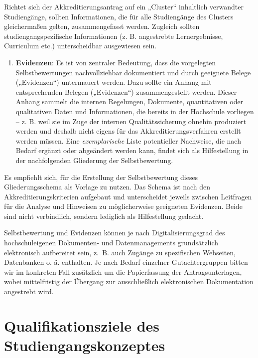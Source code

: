 Richtet sich der Akkreditierungsantrag auf ein „Cluster`` inhaltlich
verwandter Studiengänge, sollten Informationen, die für alle
Studiengänge des Clusters gleichermaßen gelten, zusammengefasst werden.
Zugleich sollten studiengangspezifische Informationen (z. B. angestrebte
Lernergebnisse, Curriculum etc.) unterscheidbar ausgewiesen sein.

\begin{enumerate}
\def\labelenumi{\arabic{enumi}.}
\tightlist
\item
  \textbf{Evidenzen}: Es ist von zentraler Bedeutung, dass die
  vorgelegten Selbstbewertungen nachvollziehbar dokumentiert und durch
  geeignete Belege („Evidenzen``) untermauert werden. Dazu sollte ein
  Anhang mit entsprechenden Belegen („Evidenzen``) zusammengestellt
  werden. Dieser Anhang sammelt die internen Regelungen, Dokumente,
  quantitativen oder qualitativen Daten und Informationen, die bereits
  in der Hochschule vorliegen -- z. B. weil sie im Zuge der internen
  Qualitätssicherung ohnehin produziert werden und deshalb nicht eigens
  für das Akkreditierungsverfahren erstellt werden müssen. Eine
  \emph{exemplarische} Liste potentieller Nachweise, die nach Bedarf
  ergänzt oder abgeändert werden kann, findet sich als Hilfestellung in
  der nachfolgenden Gliederung der Selbstbewertung.
\end{enumerate}

Es empfiehlt sich, für die Erstellung der Selbstbewertung dieses
Gliederungsschema als Vorlage zu nutzen. Das Schema ist nach den
Akkreditierungskriterien aufgebaut und unterscheidet jeweils zwischen
Leitfragen für die Analyse und Hinweisen zu möglicherweise geeigneten
Evidenzen. Beide sind nicht verbindlich, sondern lediglich als
Hilfestellung gedacht.

Selbstbewertung und Evidenzen können je nach Digitalisierungsgrad des
hochschuleigenen Dokumenten- und Datenmanagements grundsätzlich
elektronisch aufbereitet sein, z.~B. auch Zugänge zu spezifischen
Webseiten, Datenbanken o. ä. enthalten. Je nach Bedarf einzelner
Gutachtergruppen bitten wir im konkreten Fall zusätzlich um die
Papierfassung der Antragsunterlagen, wobei mittelfristig der Übergang
zur ausschließlich elektronischen Dokumentation angestrebt wird.

%

\chapter{Qualifikationsziele des Studiengangskonzeptes}\label{Qualifikationsziele des Studiengangskonzeptes}


